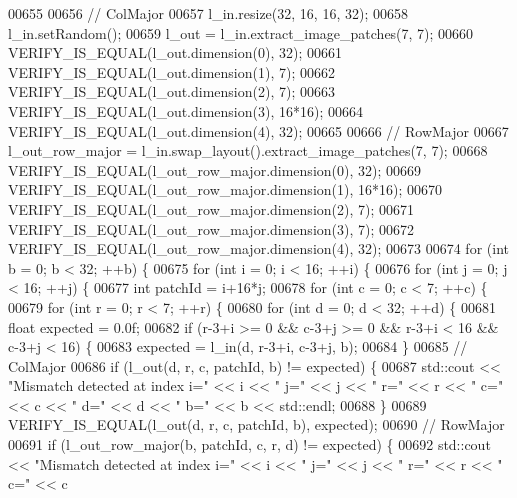 \begin{DoxyCode}
00655 
00656   \textcolor{comment}{// ColMajor}
00657   l\_in.resize(32, 16, 16, 32);
00658   l\_in.setRandom();
00659   l\_out = l\_in.extract\_image\_patches(7, 7);
00660   VERIFY\_IS\_EQUAL(l\_out.dimension(0), 32);
00661   VERIFY\_IS\_EQUAL(l\_out.dimension(1), 7);
00662   VERIFY\_IS\_EQUAL(l\_out.dimension(2), 7);
00663   VERIFY\_IS\_EQUAL(l\_out.dimension(3), 16*16);
00664   VERIFY\_IS\_EQUAL(l\_out.dimension(4), 32);
00665 
00666   \textcolor{comment}{// RowMajor}
00667   l\_out\_row\_major = l\_in.swap\_layout().extract\_image\_patches(7, 7);
00668   VERIFY\_IS\_EQUAL(l\_out\_row\_major.dimension(0), 32);
00669   VERIFY\_IS\_EQUAL(l\_out\_row\_major.dimension(1), 16*16);
00670   VERIFY\_IS\_EQUAL(l\_out\_row\_major.dimension(2), 7);
00671   VERIFY\_IS\_EQUAL(l\_out\_row\_major.dimension(3), 7);
00672   VERIFY\_IS\_EQUAL(l\_out\_row\_major.dimension(4), 32);
00673 
00674   \textcolor{keywordflow}{for} (\textcolor{keywordtype}{int} b = 0; b < 32; ++b) \{
00675     \textcolor{keywordflow}{for} (\textcolor{keywordtype}{int} i = 0; i < 16; ++i) \{
00676       \textcolor{keywordflow}{for} (\textcolor{keywordtype}{int} j = 0; j < 16; ++j) \{
00677         \textcolor{keywordtype}{int} patchId = i+16*j;
00678         \textcolor{keywordflow}{for} (\textcolor{keywordtype}{int} c = 0; c < 7; ++c) \{
00679           \textcolor{keywordflow}{for} (\textcolor{keywordtype}{int} r = 0; r < 7; ++r) \{
00680             \textcolor{keywordflow}{for} (\textcolor{keywordtype}{int} d = 0; d < 32; ++d) \{
00681               \textcolor{keywordtype}{float} expected = 0.0f;
00682               \textcolor{keywordflow}{if} (r-3+i >= 0 && c-3+j >= 0 && r-3+i < 16 && c-3+j < 16) \{
00683                 expected = l\_in(d, r-3+i, c-3+j, b);
00684               \}
00685               \textcolor{comment}{// ColMajor}
00686               \textcolor{keywordflow}{if} (l\_out(d, r, c, patchId, b) != expected) \{
00687                 std::cout << \textcolor{stringliteral}{"Mismatch detected at index i="} << i << \textcolor{stringliteral}{" j="} << j << \textcolor{stringliteral}{" r="} << r << \textcolor{stringliteral}{" c="} << c
       << \textcolor{stringliteral}{" d="} << d << \textcolor{stringliteral}{" b="} << b << std::endl;
00688               \}
00689               VERIFY\_IS\_EQUAL(l\_out(d, r, c, patchId, b), expected);
00690               \textcolor{comment}{// RowMajor}
00691               \textcolor{keywordflow}{if} (l\_out\_row\_major(b, patchId, c, r, d) != expected) \{
00692                 std::cout << \textcolor{stringliteral}{"Mismatch detected at index i="} << i << \textcolor{stringliteral}{" j="} << j << \textcolor{stringliteral}{" r="} << r << \textcolor{stringliteral}{" c="} << c

\end{DoxyCode}
